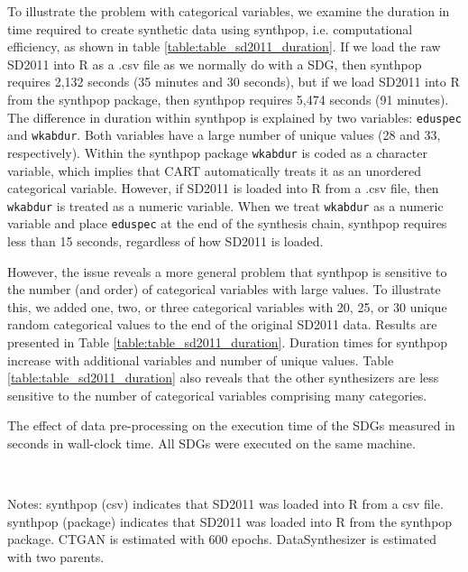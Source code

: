 \documentclass[runningheads]{llncs}
\begin{document}
To illustrate the problem with categorical variables, we examine the duration in time required to create synthetic data using synthpop, i.e. computational efficiency, as shown in table \ref{table:table_sd2011_duration}.  If we load the raw SD2011 into \textsf{R} as a .csv file as we normally do with a SDG, then synthpop requires 2,132 seconds (35 minutes and 30 seconds), but if we load SD2011 into \textsf{R} from the synthpop package, then synthpop requires 5,474 seconds (91 minutes).  The difference in duration within synthpop is explained by two variables: \texttt{eduspec} and \texttt{wkabdur}.  Both variables have a large number of unique values (28 and 33, respectively). Within the synthpop package \texttt{wkabdur} is coded as a character variable, which implies that CART automatically treats it as an unordered categorical variable.  However, if SD2011 is loaded into \textsf{R} from a .csv file, then \texttt{wkabdur} is treated as a numeric variable.  When we treat \texttt{wkabdur} as a numeric variable and place \texttt{eduspec} at the end of the synthesis chain, synthpop requires less than 15 seconds, regardless of how SD2011 is loaded.  

However, the issue reveals a more general problem that synthpop is sensitive to the number (and order) of categorical variables with large values.  To illustrate this, we added one, two, or three categorical variables with 20, 25, or 30 unique random categorical values to the end of the original SD2011 data.  Results are presented in Table \ref{table:table_sd2011_duration}. Duration times for synthpop increase with additional variables and number of unique values.  Table \ref{table:table_sd2011_duration} also reveals that the other synthesizers are less sensitive to the number of categorical variables comprising many categories.


\begin{table}[t]
    \centering
    \caption{The effect of data pre-processing on the execution time of the SDGs measured in seconds in wall-clock time. All SDGs were executed on the same machine. }
    \resizebox{\textwidth}{!}{}
    \label{table:table_sd2011_duration}
    \\
    \raggedright
    \tiny{Notes: synthpop (csv) indicates that SD2011 was loaded into R from a csv file.  synthpop (package) indicates that SD2011 was loaded into R from the synthpop package.  CTGAN is estimated with 600 epochs.  DataSynthesizer is estimated with two parents.}
    \vspace{-2em}
\end{table}
\end{document}
